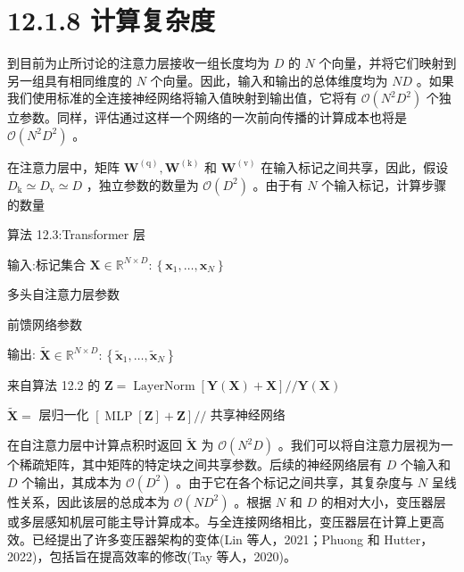 \documentclass[10pt]{article}
\begin{document}
\section*{12.1.8 计算复杂度}

到目前为止所讨论的注意力层接收一组长度均为 \(D\) 的 \(N\) 个向量，并将它们映射到另一组具有相同维度的 \(N\) 个向量。因此，输入和输出的总体维度均为 \({ND}\) 。如果我们使用标准的全连接神经网络将输入值映射到输出值，它将有 \(\mathcal{O}\left( {{N}^{2}{D}^{2}}\right)\) 个独立参数。同样，评估通过这样一个网络的一次前向传播的计算成本也将是 \(\mathcal{O}\left( {{N}^{2}{D}^{2}}\right)\) 。

在注意力层中，矩阵 \({\mathbf{W}}^{\left( \mathrm{q}\right) },{\mathbf{W}}^{\left( \mathrm{k}\right) }\) 和 \({\mathbf{W}}^{\left( \mathrm{v}\right) }\) 在输入标记之间共享，因此，假设 \({D}_{\mathrm{k}} \simeq  {D}_{\mathrm{v}} \simeq  D\) ，独立参数的数量为 \(\mathcal{O}\left( {D}^{2}\right)\) 。由于有 \(N\) 个输入标记，计算步骤的数量

算法 12.3:Transformer 层

输入:标记集合 \(\mathbf{X} \in  {\mathbb{R}}^{N \times  D} : \left\{  {{\mathbf{x}}_{1},\ldots ,{\mathbf{x}}_{N}}\right\}\)

多头自注意力层参数

前馈网络参数

输出: \(\widetilde{\mathbf{X}} \in  {\mathbb{R}}^{N \times  D} : \left\{  {{\widetilde{\mathbf{x}}}_{1},\ldots ,{\widetilde{\mathbf{x}}}_{N}}\right\}\)

来自算法 12.2 的 \(\mathbf{Z} = \operatorname{LayerNorm}\left\lbrack  {\mathbf{Y}\left( \mathbf{X}\right)  + \mathbf{X}}\right\rbrack  //\mathbf{Y}\left( \mathbf{X}\right)\)

\(\widetilde{\mathbf{X}} =\) 层归一化 \(\left\lbrack  {\operatorname{MLP}\left\lbrack  \mathbf{Z}\right\rbrack   + \mathbf{Z}}\right\rbrack  //\) 共享神经网络

在自注意力层中计算点积时返回 \(\widetilde{\mathbf{X}}\) 为 \(\mathcal{O}\left( {{N}^{2}D}\right)\) 。我们可以将自注意力层视为一个稀疏矩阵，其中矩阵的特定块之间共享参数。后续的神经网络层有 \(D\) 个输入和 \(D\) 个输出，其成本为 \(\mathcal{O}\left( {D}^{2}\right)\) 。由于它在各个标记之间共享，其复杂度与 \(N\) 呈线性关系，因此该层的总成本为 \(\mathcal{O}\left( {N{D}^{2}}\right)\) 。根据 \(N\) 和 \(D\) 的相对大小，变压器层或多层感知机层可能主导计算成本。与全连接网络相比，变压器层在计算上更高效。已经提出了许多变压器架构的变体(Lin 等人，2021；Phuong 和 Hutter，2022)，包括旨在提高效率的修改(Tay 等人，2020)。
\end{document}
